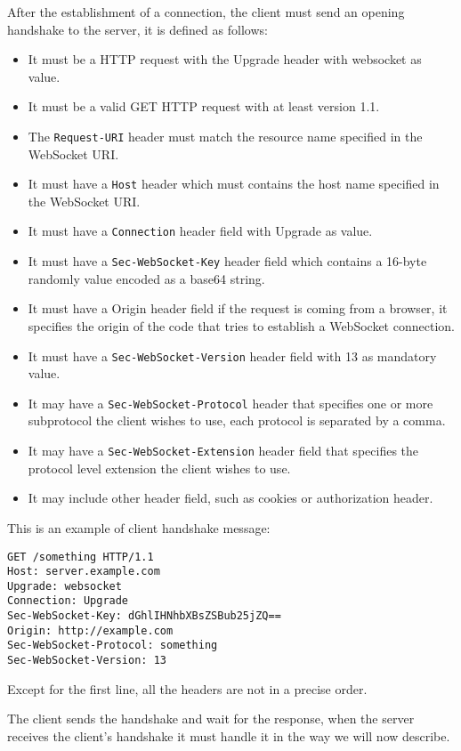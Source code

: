 After the establishment of a connection, the client must send an opening handshake to the server, it is defined as follows:
\begin{itemize}
	\item It must be a HTTP request with the Upgrade header with websocket as value.
	\item It must be a valid GET HTTP request with at least version 1.1.
	\item The \texttt{Request-URI} header must match the resource name specified in the WebSocket URI.
	\item It must have a \texttt{Host} header which must contains the host name specified in the WebSocket URI.
	\item It must have a \texttt{Connection} header field with Upgrade as value.
	\item It must have a \texttt{Sec-WebSocket-Key} header field which contains a 16-byte randomly value encoded as a base64 string.
	\item It must have a Origin header field if the request is coming from a browser, it specifies the origin of the code that tries to establish a WebSocket connection.
	\item It must have a \texttt{Sec-WebSocket-Version} header field with 13 as mandatory value.
	\item It may have a \texttt{Sec-WebSocket-Protocol} header that specifies one or more subprotocol the client wishes to use, each protocol is separated by a comma.
	\item It may have a \texttt{Sec-WebSocket-Extension} header field that specifies the protocol level extension the client wishes to use.
	\item It may include other header field, such as cookies or authorization header.
	
\end{itemize}

This is an example of client handshake message:
\begin{lstlisting}
GET /something HTTP/1.1
Host: server.example.com
Upgrade: websocket
Connection: Upgrade
Sec-WebSocket-Key: dGhlIHNhbXBsZSBub25jZQ==
Origin: http://example.com
Sec-WebSocket-Protocol: something
Sec-WebSocket-Version: 13
\end{lstlisting}

Except for the first line, all the headers are not in a precise order.\newline

The client sends the handshake and wait for the response, when the server receives the client’s handshake it must handle it in the way we will now describe.\newline


